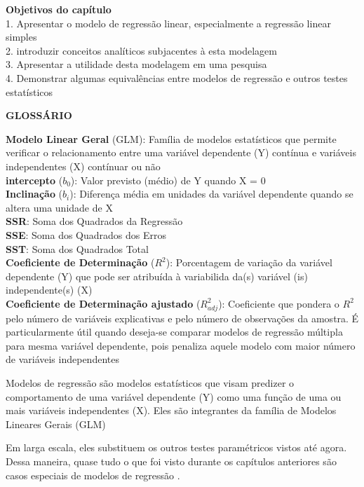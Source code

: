 \documentclass[
]{book}
\begin{document}
\begin{objectives}
\textbf{Objetivos do capítulo}\\
1. Apresentar o modelo de regressão linear, especialmente a regressão
linear simples\\
2. introduzir conceitos analíticos subjacentes à esta modelagem\\
3. Apresentar a utilidade desta modelagem em uma pesquisa\\
4. Demonstrar algumas equivalências entre modelos de regressão e outros
testes estatísticos
\end{objectives}

\begin{writing}
\textbf{GLOSSÁRIO}

\textbf{Modelo Linear Geral} (GLM): Família de modelos estatísticos que
permite verificar o relacionamento entre uma variável dependente (Y)
contínua e variáveis independentes (X) contínuar ou não\\
\textbf{intercepto} (\(b_0\)): Valor previsto (médio) de Y quando X =
0\\
\textbf{Inclinação} (\(b_i\)): Diferença média em unidades da variável
dependente quando se altera uma unidade de X\\
\textbf{SSR}: Soma dos Quadrados da Regressão\\
\textbf{SSE}: Soma dos Quadrados dos Erros\\
\textbf{SST}: Soma dos Quadrados Total\\
\textbf{Coeficiente de Determinação} (\(R^2\)): Porcentagem de variação
da variável dependente (Y) que pode ser atribuída à variabilida da(s)
variável (is) independente(s) (X)\\
\textbf{Coeficiente de Determinação ajustado} (\(R^2_{adj}\)):
Coeficiente que pondera o \(R^2\) pelo número de variáveis explicativas
e pelo número de observações da amostra. É particularmente útil quando
deseja-se comparar modelos de regressão múltipla para mesma variável
dependente, pois penaliza aquele modelo com maior número de variáveis
independentes
\end{writing}

Modelos de regressão são modelos estatísticos que visam predizer o comportamento de uma variável dependente (Y) como uma função de uma ou mais variáveis independentes (X). Eles são integrantes da família de Modelos Lineares Gerais (GLM)

Em larga escala, eles substituem os outros testes paramétricos vistos até agora. Dessa maneira, quase tudo o que foi visto durante os capítulos anteriores são casos especiais de modelos de regressão \citep{Chartier2008}.
\end{document}
